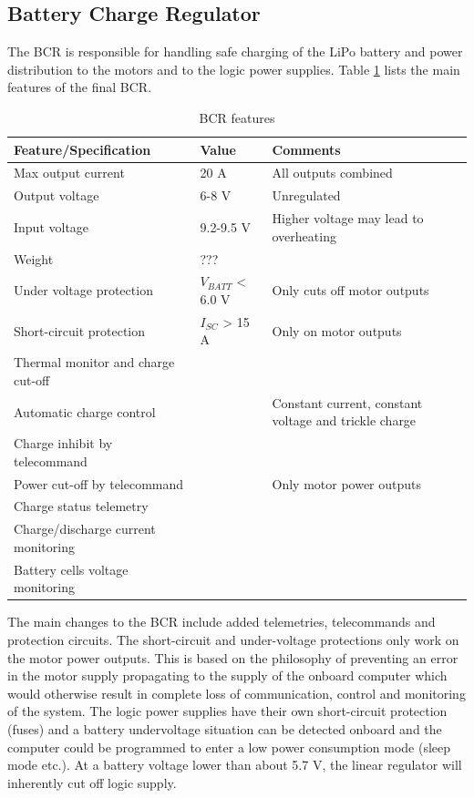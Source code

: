 \subsection{Battery Charge Regulator}
\label{sec:changes_BCR}
%
The \ac{BCR} is responsible for handling safe charging of the \ac{LiPo} battery and power distribution to the motors and to the logic power supplies. Table \ref{tab:BCR_features} lists the main features of the final \ac{BCR}.
%
\begin{table}[H]
\centering
\caption{\ac{BCR} features}
\label{tab:BCR_features}
\begin{tabular}{p{}p{}p{}}
\hline
\textbf{Feature/Specification} & \textbf{Value} & \textbf{Comments}\\
\hline
Max output current & 20 A & All outputs combined \\
Output voltage & 6-8 V & Unregulated \\
Input voltage & 9.2-9.5 V & Higher voltage may lead to overheating\\
Weight & ??? & \\
Under voltage protection & $V_{BATT}$ < 6.0 V & Only cuts off motor outputs \\
Short-circuit protection & $I_{SC}$ > 15 A & Only on motor outputs \\
Thermal monitor and charge cut-off & & \\
Automatic charge control &  & Constant current, constant voltage and trickle charge\\
Charge inhibit by telecommand & & \\
Power cut-off by telecommand & & Only motor power outputs\\
Charge status telemetry & &\\
Charge/discharge current monitoring & & \\
Battery cells voltage monitoring & & \\
\hline
\end{tabular}
\end{table} 
%
\noindent
The main changes to the \ac{BCR} include added telemetries, telecommands and protection circuits. The short-circuit and under-voltage protections only work on the motor power outputs. This is based on the philosophy of preventing an error in the motor supply propagating to the supply of the onboard computer which would otherwise result in complete loss of communication, control and monitoring of the system. The logic power supplies have their own short-circuit protection (fuses) and a battery undervoltage situation can be detected onboard and the computer could be programmed to enter a low power consumption mode (sleep mode etc.). At a battery voltage lower than about 5.7 V, the linear regulator will inherently cut off logic supply.\\\\
